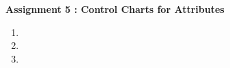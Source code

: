 \documentclass[a4 paper, 12pt]{report}
\begin{document}
\begin{center}
    \large \textbf{Assignment 5 : Control Charts for Attributes}
\end{center}
    

\begin{enumerate}
    
    \item 
    
    \item 
    
    \item 
    
\end{enumerate}
\end{document}
